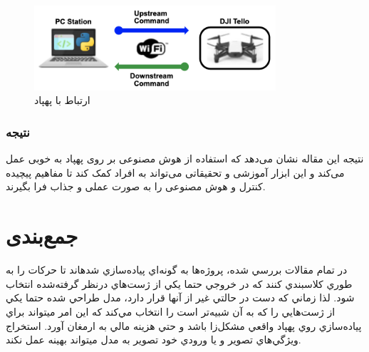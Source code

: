 \begin{figure}[h]
    \centering
    \includegraphics[width=0.8\textwidth]{tello.png}
    \caption{ارتباط با پهپاد }
\end{figure}

\subsubsection{نتیجه}
نتیجه این مقاله نشان می‌دهد که استفاده از هوش مصنوعی بر روی پهپاد  به خوبی عمل می‌کند و این ابزار آموزشی و تحقیقاتی می‌تواند به افراد کمک کند تا مفاهیم پیچیده کنترل و هوش مصنوعی را به صورت عملی و جذاب فرا بگیرند. 
\cite{ghazi2023use}

\section{جمع‌بندی}
در تمام مقالات بررسي شده، پروژه‌ها به گونه‌اي پياده‌سازي شدهاند تا حركات را به طوري كلاسبندي كنند كه در خروجي حتما يكي از ژست‌هاي درنظر گرفته‌شده انتخاب شود. لذا زماني كه دست در حالتي غير از آنها قرار دارد، مدل طراحي شده 
حتما يكي از ژست‌هايي را كه به آن شبيه‌تر است را انتخاب مي‌كند كه اين امر ميتواند براي پياده‌سازي روي پهپاد واقعي مشكل‌زا باشد و حتي هزينه مالي به ارمغان آورد. استخراج ويژگي‌هاي تصوير و يا ورودي خود تصوير به مدل ميتواند بهينه عمل نكند.